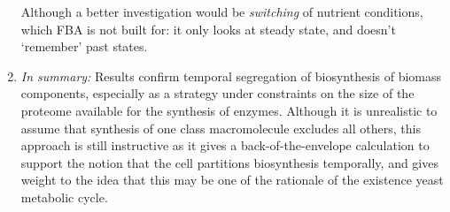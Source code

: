 \begin{enumerate}
        Although a better investigation would be \emph{switching} of nutrient conditions, which FBA is not built for: it only looks at steady state, and doesn't `remember' past states.
  \item \emph{In summary:} Results confirm temporal segregation of biosynthesis of biomass components, especially as a strategy under constraints on the size of the proteome available for the synthesis of enzymes.
        Although it is unrealistic to assume that synthesis of one class macromolecule excludes all others, this approach is still instructive as it gives a back-of-the-envelope calculation to support the notion that the cell partitions biosynthesis temporally, and gives weight to the idea that this may be one of the rationale of the existence yeast metabolic cycle.
\end{enumerate}

